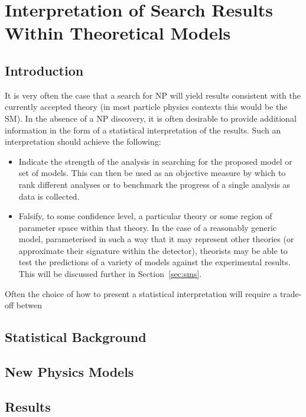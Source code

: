 \chapter{Interpretation of Search Results Within Theoretical Models}
\section{Introduction}
It is very often the case that a search for \ac{NP} will yield results
consistent with the currently accepted theory (in most particle physics contexts
this would be the \ac{SM}). In the absence of a \ac{NP} discovery, it is often
desirable to provide additional information in the form of a statistical
interpretation of the results. Such an interpretation should achieve the
following:
\begin{itemize}
\item Indicate the strength of the analysis in searching for the proposed model
  or set of models. This can then be used as an objective measure by which to
  rank different analyses or to benchmark the progress of a single analysis as
  data is collected.
\item Falsify, to some confidence level, a particular theory or some region of
  parameter space within that theory. In the case of a reasonably generic model,
  parameterised in such a way that it may represent other theories (or
  approximate their signature within the detector), theorists may be able to
  test the predictions of a variety of models against the experimental
  results. This will be discussed further in Section~\ref{sec:sms}.
\end{itemize}

Often the choice of how to present a statistical interpretation will require a
trade-off betwen



\section{Statistical Background}
\section{New Physics Models}
\section{Results}